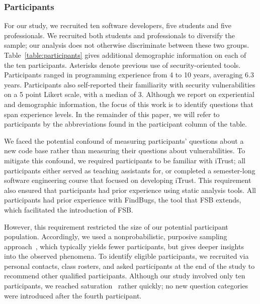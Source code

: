 \documentclass[10pt,journal,compsoc]{IEEEtran}
\begin{document}
\subsubsection{Participants}
For our study, we recruited ten software developers, five students and five professionals.
We recruited both students and professionals to diversify the sample; our analysis does not otherwise discriminate between these two groups.
Table~\ref{table:participants} gives additional demographic information on each of the ten participants. 
Asterisks denote previous use of security-oriented tools.
Participants ranged in programming experience from 4 to 10 years, averaging 6.3 years.
Participants also self-reported their familiarity with security vulnerabilities on a 5 point Likert scale, with a median of 3.
Although we report on experiential and demographic information, the focus of this work is to identify questions that span experience levels.
In the remainder of this paper, we will refer to participants by the abbreviations found in the participant column of the table.

We faced the potential confound of measuring participants' questions about a new code base rather than measuring their questions about vulnerabilities.
To mitigate this confound, we required participants to be familiar with iTrust;
all participants either served as teaching assistants for, or completed a semester-long software engineering course that focused on developing iTrust.
This requirement also ensured that participants had prior experience using static analysis tools.
All participants had prior experience with FindBugs, the tool that FSB extends, which facilitated the introduction of FSB.

However, this requirement restricted the size of our potential participant population.
Accordingly, we used a nonprobabilistic, purposive sampling approach~\cite{guest2006many}, which typically yields fewer participants, but gives deeper insights into the observed phenomena.
To identify eligible participants, we recruited via personal contacts, class rosters, and asked participants at the end of the study to recommend other qualified participants.
Although our study involved only ten participants, we reached saturation~\cite{glaser2009discovery} rather quickly; 
no new question categories were introduced after the fourth participant.
\end{document}
